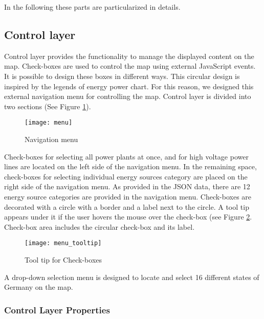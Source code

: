 In the following these parts are particularized in details.

\subsection{Control layer}
\label{sssec:controlLayer}

Control layer provides the functionality to manage the displayed content on the map. Check-boxes are used to control the map using external JavaScript events. It is possible to design these boxes in different ways. This circular design is inspired by the legends of energy power chart. For this reason, we designed this external navigation menu for controlling the map. Control layer is divided into two sections (See Figure \ref{fig:menuu}).

\begin{figure} [H]
  \begin{center}
    \texttt{[image: menu]}
    \caption{Navigation menu}
    \label{fig:menuu}
  \end{center}
\end{figure}


Check-boxes for selecting all power plants at once, and for high voltage power lines are located on the left side of the navigation menu. In the remaining space, check-boxes for selecting individual energy sources category are placed on the right side of the navigation menu. As provided in the JSON data, there are 12 energy source categories are provided in the navigation menu. Check-boxes are decorated with a circle with a border and a label next to the circle. A tool tip appears under it if the user hovers the mouse over the check-box (see Figure \ref{fig:menuTT}. Check-box area includes the circular check-box and its label. 

\begin{figure} [H]
  \begin{center}
    \texttt{[image: menu\_tooltip]}
    \caption{Tool tip for Check-boxes}
    \label{fig:menuTT}
  \end{center}
\end{figure}

A drop-down selection menu is designed to locate and select 16 different states of Germany on the map. %


\subsubsection*{Control Layer Properties}

